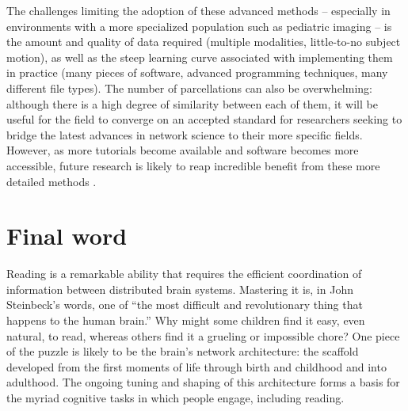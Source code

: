 The challenges limiting the adoption of these advanced methods -- especially in environments with a more specialized population such as pediatric imaging -- is the amount and quality of data required (multiple modalities, little-to-no subject motion), as well as the steep learning curve associated with implementing them in practice (many pieces of software, advanced programming techniques, many different file types). The number of parcellations can also be overwhelming: although there is a high degree of similarity between each of them, it will be useful for the field to converge on an accepted standard for researchers seeking to bridge the latest advances in network science to their more specific fields. However, as more tutorials become available and software becomes more accessible, future research is likely to reap incredible benefit from these more detailed methods \citep{Poldrack2015}.

\section{Final word}

Reading is a remarkable ability that requires the efficient coordination of information between distributed brain systems. Mastering it is, in John Steinbeck's words, one of ``the most difficult and revolutionary thing that happens to the human brain.'' Why might some children find it easy, even natural, to read, whereas others find it a grueling or impossible chore? One piece of the puzzle is likely to be the brain's network architecture: the scaffold developed from the first moments of life through birth and childhood and into adulthood. The ongoing tuning and shaping of this architecture forms a basis for the myriad cognitive tasks in which people engage, including reading.